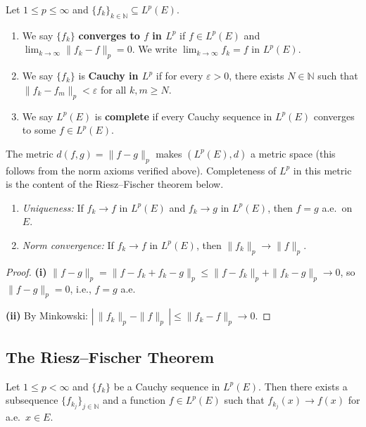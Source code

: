 \documentclass[11pt]{report}
\begin{document}
\begin{defbox}
Let $1 \leq p \leq \infty$ and $\{f_k\}_{k \in \mathbb{N}} \subseteq L^p(E)$.
\begin{enumerate}[label=(\roman*)]
\item We say $\{f_k\}$ \textbf{converges to $f$ in $L^p$} if $f \in L^p(E)$ and $\lim_{k \to \infty} \|f_k - f\|_p = 0$. We write $\lim_{k \to \infty} f_k = f$ in $L^p(E)$.
\item We say $\{f_k\}$ is \textbf{Cauchy in $L^p$} if for every $\varepsilon > 0$, there exists $N \in \mathbb{N}$ such that $\|f_k - f_m\|_p < \varepsilon$ for all $k, m \geq N$.
\item We say $L^p(E)$ is \textbf{complete} if every Cauchy sequence in $L^p(E)$ converges to some $f \in L^p(E)$.
\end{enumerate}
\end{defbox}

\begin{rembox}
The metric $d(f, g) = \|f - g\|_p$ makes $(L^p(E), d)$ a metric space (this follows from the norm axioms verified above). Completeness of $L^p$ in this metric is the content of the Riesz--Fischer theorem below.
\end{rembox}

\begin{propbox}
\begin{enumerate}[label=(\roman*)]
\item \textit{Uniqueness:} If $f_k \to f$ in $L^p(E)$ and $f_k \to g$ in $L^p(E)$, then $f = g$ a.e.\ on $E$.
\item \textit{Norm convergence:} If $f_k \to f$ in $L^p(E)$, then $\|f_k\|_p \to \|f\|_p$.
\end{enumerate}
\end{propbox}

\begin{proof}
\textbf{(i)} $\|f - g\|_p = \|f - f_k + f_k - g\|_p \leq \|f - f_k\|_p + \|f_k - g\|_p \to 0$, so $\|f - g\|_p = 0$, i.e., $f = g$ a.e.

\textbf{(ii)} By Minkowski: $|\,\|f_k\|_p - \|f\|_p\,| \leq \|f_k - f\|_p \to 0$.
\end{proof}

\subsection{The Riesz--Fischer Theorem}

\begin{lembox}
Let $1 \leq p < \infty$ and $\{f_k\}$ be a Cauchy sequence in $L^p(E)$. Then there exists a subsequence $\{f_{k_j}\}_{j \in \mathbb{N}}$ and a function $f \in L^p(E)$ such that $f_{k_j}(x) \to f(x)$ for a.e.\ $x \in E$.
\end{lembox}
\end{document}
